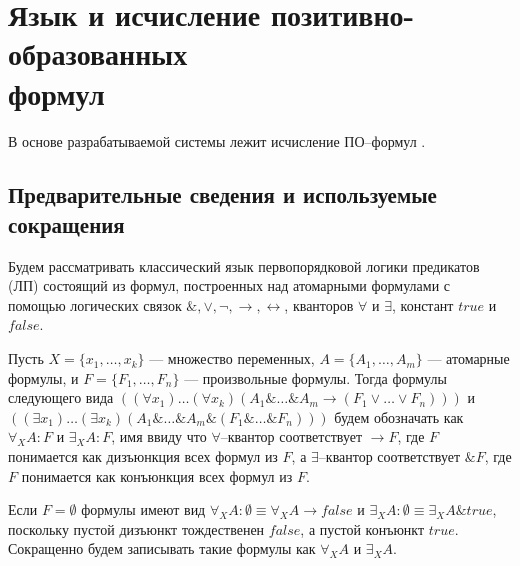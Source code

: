 
\section[Язык и исчисление позитивно-образованных формул]{Язык и исчисление позитивно-образованных\\ формул}

В основе разрабатываемой системы лежит исчисление ПО--формул \cite{ICDS2000, DavydovX, SNV1990, mais}.


\subsection{Предварительные сведения и используемые сокращения}
Будем рассматривать классический язык первопорядковой логики предикатов (ЛП) состоящий из формул, построенных над атомарными формулами с помощью логических связок $\&, \vee, \neg, \rightarrow, \leftrightarrow$, кванторов $\forall$ и $\exists$, констант $true$ и $false$.

Пусть $X = \{x_1,\ldots,x_k\}$ --- множество переменных, $A = \{A_1,\ldots,A_m\}$ --- атомарные формулы, и $F = \{F_1,\ldots,F_n\}$ --- произвольные формулы. Тогда формулы следующего вида $((\forall x_1) \ldots (\forall x_k) (A_1 \& \ldots \& A_m \rightarrow (F_1 \vee \ldots \vee F_n)))$ и $((\exists x_1) \ldots (\exists x_k) (A_1 \& \ldots \& A_m \& (F_1 \& \ldots \& F_n)))$ будем обозначать как $\forall_XA\colon F$ и $\exists_XA\colon F$, имя ввиду что $\forall$--квантор соответствует $\rightarrow F$, где $F$ понимается как дизъюнкция всех формул из $F$, а $\exists$--квантор соответствует $\& F$, где $F$ понимается как конъюнкция всех формул из $F$.

Если $F = \emptyset$ формулы имеют вид $\forall_XA\colon\emptyset \equiv \forall_XA \rightarrow false$ и $\exists_XA\colon\emptyset \equiv \exists_XA \& true$, поскольку пустой дизъюнкт тождественен $false$, а пустой конъюнкт $true$. Сокращенно будем записывать такие формулы как $\forall_XA$ и $\exists_XA$.


